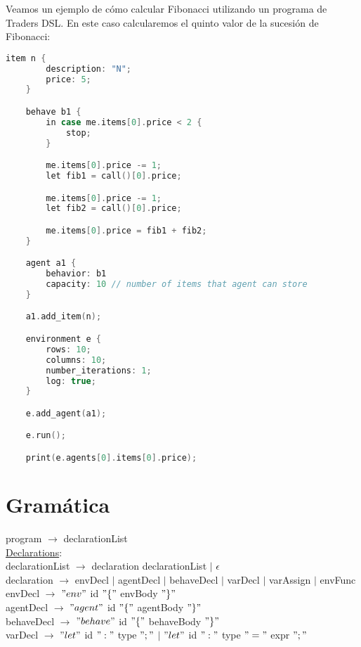 \documentclass{article}
\begin{document}
Veamos un ejemplo de cómo calcular Fibonacci utilizando un programa de Traders DSL. En este caso calcularemos el quinto valor de la sucesión de Fibonacci:

\begin{lstlisting}[language=c]
	item n {
		description: "N";
		price: 5;
	}	

	behave b1 {
		in case me.items[0].price < 2 {
			stop;
		}

		me.items[0].price -= 1;
		let fib1 = call()[0].price;

		me.items[0].price -= 1;
		let fib2 = call()[0].price;

		me.items[0].price = fib1 + fib2;
	}

	agent a1 {
		behavior: b1
		capacity: 10 // number of items that agent can store
	}

	a1.add_item(n);

	environment e {
		rows: 10;
		columns: 10;
		number_iterations: 1;
		log: true;
	}

	e.add_agent(a1);

	e.run();

	print(e.agents[0].items[0].price);

\end{lstlisting}


\section{Gramática}

program $\rightarrow$ declarationList \\

\underline{Declarations}: \\

declarationList $\rightarrow$ declaration declarationList  $\vert$ $\epsilon$ \\

declaration $\rightarrow$ envDecl $\vert$ agentDecl $\vert$ behaveDecl $\vert$ varDecl $\vert$ varAssign $\vert$ envFunc\\

envDecl $\rightarrow$ $"env"$ id $"\{"$ envBody $"\}"$ \\

agentDecl $\rightarrow$ $"agent"$ id $"\{"$ agentBody $"\}"$ \\

behaveDecl $\rightarrow$ $"behave"$ id $"\{"$ behaveBody $"\}"$ \\

varDecl $\rightarrow$ $"let"$ id $":"$ type $";"$ $\vert$ $"let"$ id $":"$ type $"="$ expr $";"$ \\
\end{document}
